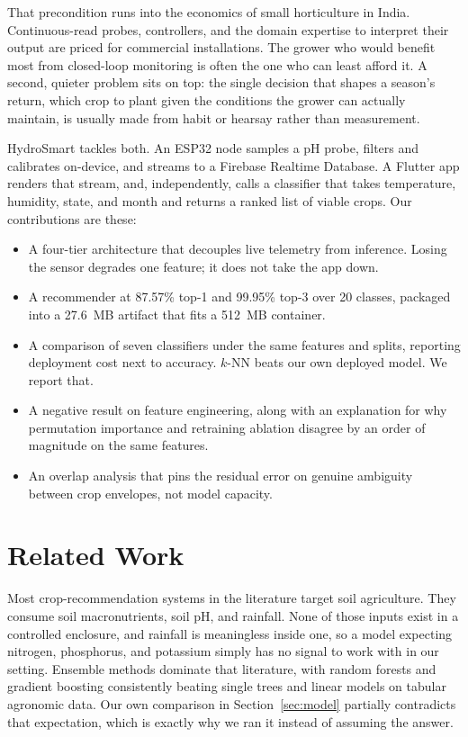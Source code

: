\documentclass[conference]{IEEEtran}
\begin{document}
That precondition runs into the economics of small horticulture in India.
Continuous-read probes, controllers, and the domain expertise to interpret
their output are priced for commercial installations. The grower who would
benefit most from closed-loop monitoring is often the one who can least afford
it. A second, quieter problem sits on top: the single decision that shapes a
season's return, which crop to plant given the conditions the grower can
actually maintain, is usually made from habit or hearsay rather than
measurement.

HydroSmart tackles both. An ESP32 node samples a pH probe, filters and
calibrates on-device, and streams to a Firebase Realtime Database. A Flutter
app renders that stream, and, independently, calls a classifier that takes
temperature, humidity, state, and month and returns a ranked list of viable
crops. Our contributions are these:

\begin{itemize}
\item A four-tier architecture that decouples live telemetry from inference.
      Losing the sensor degrades one feature; it does not take the app down.
\item A recommender at 87.57\% top-1 and 99.95\% top-3 over 20 classes,
      packaged into a 27.6~MB artifact that fits a 512~MB container.
\item A comparison of seven classifiers under the same features and splits,
      reporting deployment cost next to accuracy. $k$-NN beats our own
      deployed model. We report that.
\item A negative result on feature engineering, along with an explanation for
      why permutation importance and retraining ablation disagree by an order
      of magnitude on the same features.
\item An overlap analysis that pins the residual error on genuine ambiguity
      between crop envelopes, not model capacity.
\end{itemize}

\section{Related Work}
Most crop-recommendation systems in the literature target soil agriculture.
They consume soil macronutrients, soil pH, and rainfall. None of those inputs
exist in a controlled enclosure, and rainfall is meaningless inside one, so a
model expecting nitrogen, phosphorus, and potassium simply has no signal to
work with in our setting. Ensemble methods dominate that literature, with
random forests \cite{breiman2001} and gradient boosting \cite{friedman2001,ke2017,chen2016}
consistently beating single trees and linear models on tabular
agronomic data. Our own comparison in Section~\ref{sec:model} partially
contradicts that expectation, which is exactly why we ran it instead of
assuming the answer.
\end{document}
